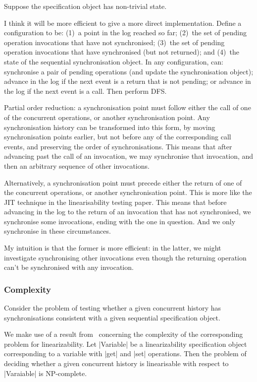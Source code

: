 Suppose the specification object has non-trivial state. 

I think it will be more efficient to give a more direct implementation.
Define a configuration to be: (1)~a point in the log reached so far; (2)~the
set of pending operation invocations that have not synchronised; (3)~the set
of pending operation invocations that have synchronised (but not returned);
and (4)~the state of the sequential synchronisation object.  In any
configuration, can: synchronise a pair of pending operations (and update the
synchronisation object); advance in the log if the next event is a return that
is not pending; or advance in the log if the next event is a call.  Then
perform DFS.

Partial order reduction: a synchronisation point must follow either the
call of one of the concurrent operations, or another synchronisation
point.  Any synchronisation history can be transformed into this form, by
moving synchronisation points earlier, but not before any of the corresponding
call events, and preserving the order of synchronisations.  This means that
after advancing past the call of an invocation, we may synchronise that
invocation, and then an arbitrary sequence of other invocations. 

Alternatively, a synchronisation point must precede either the return of one
of the concurrent operations, or another synchronisation point.  This is more
like the JIT technique in the linearisability testing paper.  This means that
before advancing in the log to the return of an invocation that has not
synchronised, we synchronise some invocations, ending with the one in
question.  And we only synchronise in these circumstances. 

My intuition is that the former is more efficient: in the latter, we might
investigate synchronising other invocations even though the returning
operation can't be synchronised with any invocation.  


\subsubsection*{Complexity}

Consider the problem of testing whether a given concurrent history has
synchronisations consistent with a given sequential specification object. 

We make use of a result from~\cite{???} concerning the complexity of the
corresponding problem for linearizability.  Let |Variable| be a
linearizability specification object corresponding to a variable with |get|
and |set| operations.  Then the problem of deciding whether a given concurrent
history is linearisable with respect to |Varaiable| is NP-complete.

